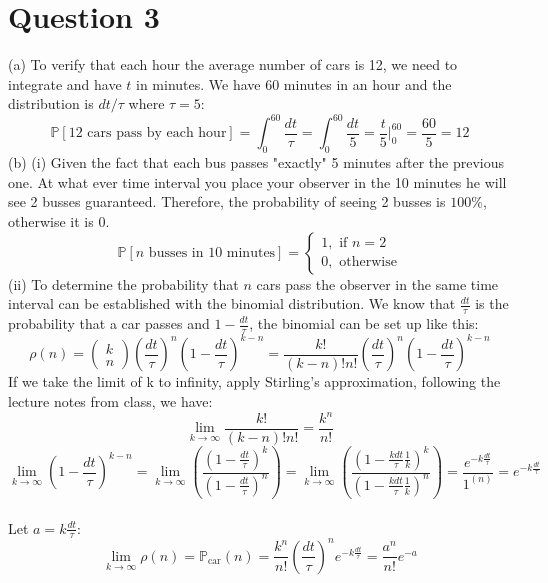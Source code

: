 \documentclass[11pt]{article}
\def\mbb{\mathbb}
\def\P{\mbb{P}}
\newcommand{\Matrix}[1]{\begin{pmatrix} #1 \end{pmatrix}}
\theoremstyle{pink}
\theoremstyle{boxedsolution}
\theoremstyle{definition}
\theoremstyle{claim}
\begin{document}
 \newpage
 \section*{Question 3}
 (a) To verify that each hour the average number of cars is 12, we need to integrate and have $t$ in minutes. We have $60$ minutes in an hour and the distribution is $dt/\tau$ where $\tau = 5$:
 \[\P[\text{12 cars pass by each hour}]=\int^{60}_0 \frac{dt}{\tau}=\int^{60}_0 \frac{dt}{5}=\frac{t}{5}\bigg|^{60}_0=\frac{60}{5}=12\]
 (b) (i) Given the fact that each bus passes "exactly" 5 minutes after the previous one. At what ever time interval you place your observer in the 10 minutes he will see 2 busses guaranteed. Therefore, the probability of seeing 2 busses is $100\%$, otherwise it is 0.
 \[\P[n \text{ busses in 10 minutes}]=
 \begin{cases}
 1, \text{ if } n=2 \\
 0, \text{ otherwise}
 \end{cases}
 \]
(ii) To determine the probability that $n$ cars pass the observer in the same time interval can be established with the binomial distribution. We know that $\frac{dt}{\tau}$ is the probability that a car passes and $1-\frac{dt}{\tau}$, the binomial can be set up like this:
\[\rho(n)=\Matrix{k\\n}\left(\frac{dt}{\tau}\right)^n\left(1-\frac{dt}{\tau}\right)^{k-n}=\frac{k!}{(k-n)!n!}\left(\frac{dt}{\tau}\right)^n\left(1-\frac{dt}{\tau}\right)^{k-n}\]
If we take the limit of k to infinity, apply Stirling's approximation, following the lecture notes from class, we have:
\[\lim_{k \to \infty}\frac{k!}{(k-n)!n!}=\frac{k^n}{n!}\]
\vspace{5mm}
\[\lim_{k \to \infty}\left(1-\frac{dt}{\tau}\right)^{k-n}=
\lim_{k \to \infty}\left(\frac{\left(1-\frac{dt}{\tau}\right)^k}{\left(1-\frac{dt}{\tau}\right)^n}\right)=\lim_{k \to \infty}\left(\frac{\left(1-\frac{kdt}{\tau}\frac{1}{k}\right)^k}{\left(1-\frac{kdt}{\tau}\frac{1}{k}\right)^n}\right)=\frac{e^{-k\frac{dt}{\tau}}}{1^{(n)}}=e^{-k\frac{dt}{\tau}}\]
\vspace{5mm}
\\Let $a=k\frac{dt}{\tau}$:
\[\lim_{k \to \infty} \rho(n) = \P_{\text{car}}(n)=\frac{k^n}{n!}\left(\frac{dt}{\tau}\right)^n e^{-k\frac{dt}{\tau}}=
\frac{a^n}{n!}e^{-a}\]

\newpage
\end{document}
